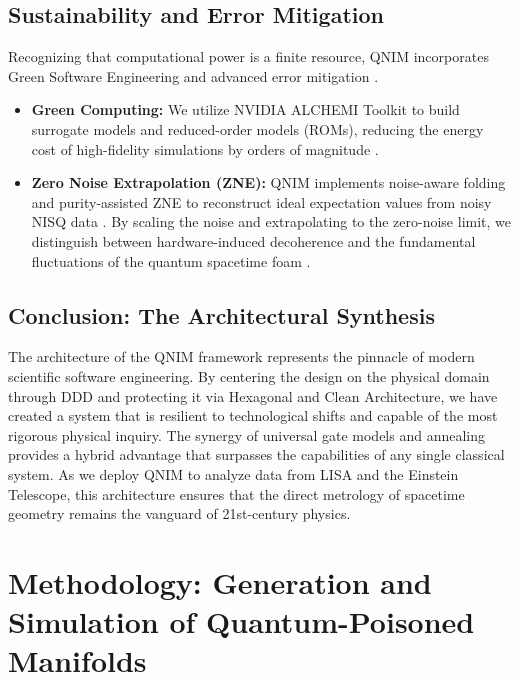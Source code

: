 \documentclass[11pt,a4paper,spanish]{book}
\numberwithin{equation}{chapter}
\numberwithin{figure}{chapter}
\numberwithin{equation}{chapter}
\numberwithin{figure}{chapter}
\numberwithin{table}{chapter}
\begin{document}
\section{Sustainability and Error Mitigation}

Recognizing that computational power is a finite resource, QNIM incorporates Green Software Engineering and advanced error mitigation \cite{fysik_lu_se_green}.
\begin{itemize}
    \item \textbf{Green Computing:} We utilize NVIDIA ALCHEMI Toolkit to build surrogate models and reduced-order models (ROMs), reducing the energy cost of high-fidelity simulations by orders of magnitude \cite{arxiv_gw_gpu_speed}.
    \item \textbf{Zero Noise Extrapolation (ZNE):} QNIM implements noise-aware folding and purity-assisted ZNE to reconstruct ideal expectation values from noisy NISQ data \cite{medium_quantum_error_mitigation}. By scaling the noise and extrapolating to the zero-noise limit, we distinguish between hardware-induced decoherence and the fundamental fluctuations of the quantum spacetime foam \cite{arxiv250310204}.
\end{itemize}

\section{Conclusion: The Architectural Synthesis}

The architecture of the QNIM framework represents the pinnacle of modern scientific software engineering. By centering the design on the physical domain through DDD and protecting it via Hexagonal and Clean Architecture, we have created a system that is resilient to technological shifts and capable of the most rigorous physical inquiry. The synergy of universal gate models and annealing provides a hybrid advantage that surpasses the capabilities of any single classical system. As we deploy QNIM to analyze data from LISA and the Einstein Telescope, this architecture ensures that the direct metrology of spacetime geometry remains the vanguard of 21st-century physics.

\chapter{Methodology: Generation and Simulation of Quantum-Poisoned Manifolds}
\label{chap:methodology}
\end{document}
